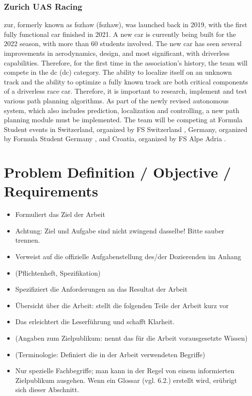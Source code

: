 \subsubsection{Zurich UAS Racing} \label{sec:Zurich UAS Racing}
\acrlong{zur}, formerly known as \acrlong{fszhaw} (\acrshort{fszhaw}), was launched back in 2019, with the first fully functional car finished in 2021. A new car is currently being built for the 2022 season, with more than 60 students involved. The new car has seen several improvements in aerodynamics, design, and most significant, with driverless capabilities. \cite{fszhaw_launch}
Therefore, for the first time in the association's history, the team will compete in the \acrlong{dc} (\acrshort{dc}) category.
The ability to localize itself on an unknown track and the ability to optimize a fully known track are both critical components of a driverless race car. Therefore, it is important to research, implement and test various path planning algorithms. As part of the newly revised autonomous system, which also includes prediction, localization and controlling, a new path planning module must be implemented.
The team will be competing at Formula Student events in Switzerland, organized by FS Switzerland \cite{fsswitzerland}, Germany, organized by Formula Student Germany \cite{fs_germany}, and Croatia, organized by FS Alpe Adria \cite{fs_alpe_adria}.

\section{Problem Definition / Objective / Requirements} \label{sec:Problem Definition / Objective / Requirements}
\begin{itemize}
    \item Formuliert das Ziel der Arbeit
    \item Achtung: Ziel und Aufgabe sind nicht zwingend dasselbe! Bitte sauber trennen.
    \item Verweist auf die offizielle Aufgabenstellung des/der Dozierenden im Anhang
    \item (Pflichtenheft, Spezifikation)
    \item Spezifiziert die Anforderungen an das Resultat der Arbeit
    \item Übersicht über die Arbeit: stellt die folgenden Teile der Arbeit kurz vor
    \item Das erleichtert die Leserführung und schafft Klarheit.
    \item (Angaben zum Zielpublikum: nennt das für die Arbeit vorausgesetzte Wissen)
    \item (Terminologie: Definiert die in der Arbeit verwendeten Begriffe)
    \item Nur spezielle Fachbegriffe; man kann in der Regel von einem informierten Zielpublikum ausgehen.
    Wenn ein Glossar (vgl. 6.2.) erstellt wird, erübrigt sich dieser Abschnitt.
\end{itemize}
